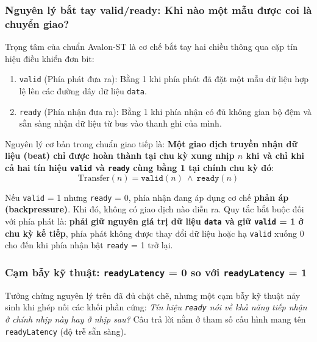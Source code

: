 \subsubsection*{Nguyên lý bắt tay valid/ready: Khi nào một mẫu được coi là chuyển giao?}
Trọng tâm của chuẩn Avalon-ST là cơ chế bắt tay hai chiều thông qua cặp tín hiệu điều khiển đơn bit:
\begin{enumerate}[leftmargin=1.5em, itemsep=2pt]
    \item \texttt{valid} (Phía phát đưa ra): Bằng 1 khi phía phát đã đặt một mẫu dữ liệu hợp lệ lên các đường dây dữ liệu \texttt{data}.
    \item \texttt{ready} (Phía nhận đưa ra): Bằng 1 khi phía nhận có đủ không gian bộ đệm và sẵn sàng nhận dữ liệu từ bus vào thanh ghi của mình.
\end{enumerate}

Nguyên lý cơ bản trong chuẩn giao tiếp là: \textbf{Một giao dịch truyền nhận dữ liệu (beat) chỉ được hoàn thành tại chu kỳ xung nhịp $n$ khi và chỉ khi cả hai tín hiệu \texttt{valid} và \texttt{ready} cùng bằng 1 tại chính chu kỳ đó}:
\begin{equation}
\text{Transfer}(n) = \texttt{valid}(n) \ \land \ \texttt{ready}(n)
\end{equation}

Nếu \texttt{valid} = 1 nhưng \texttt{ready} = 0, phía nhận đang áp dụng cơ chế \textbf{phản áp (backpressure)}. Khi đó, không có giao dịch nào diễn ra. Quy tắc bắt buộc đối với phía phát là: \textbf{phải giữ nguyên giá trị dữ liệu \texttt{data} và giữ \texttt{valid} = 1 ở chu kỳ kế tiếp}, phía phát không được thay đổi dữ liệu hoặc hạ \texttt{valid} xuống 0 cho đến khi phía nhận bật \texttt{ready} = 1 trở lại.

\subsubsection*{Cạm bẫy kỹ thuật: \texttt{readyLatency} = 0 so với \texttt{readyLatency} = 1}
Tưởng chừng nguyên lý trên đã đủ chặt chẽ, nhưng một cạm bẫy kỹ thuật nảy sinh khi ghép nối các khối phần cứng: \emph{Tín hiệu \texttt{ready} nói về khả năng tiếp nhận ở chính nhịp này hay ở nhịp sau?} Câu trả lời nằm ở tham số cấu hình mang tên \texttt{readyLatency} (độ trễ sẵn sàng).

